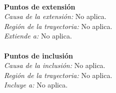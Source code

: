 \noindent \textbf{\\Puntos de extensión}\\

\noindent \textit{Causa de la extensión:} No aplica.\\
\textit{Región de la trayectoria:} No aplica.\\
\textit{Extiende a:} No aplica.\\


\noindent \textbf{\\Puntos de inclusión}\\

\noindent \textit{Causa de la inclusión:} No aplica.\\
\textit{Región de la trayectoria:} No aplica.\\
\textit{Incluye a:} No aplica.\\